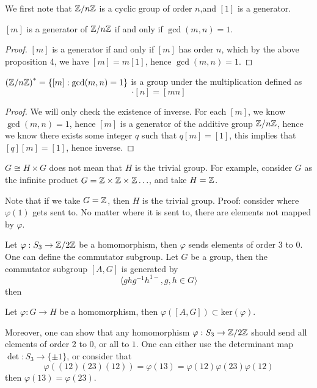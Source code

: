 We first note that $\mathbb{Z}/n\mathbb{Z}$ is a cyclic group of order $n$,and $[1]$ is a generator.
\begin{prop}
    $[m]$ is a generator of $\mathbb{Z}/n\mathbb{Z}$ if and only if $\gcd(m,n)=1$.
\end{prop}
\begin{proof}
    $[m]$ is a generator if and only if $[m]$ has order $n$, which by the above proposition 4, we have $[m]=m[1]$, hence $\gcd(m,n)=1$.
\end{proof}
\begin{prop}
    ${(\mathbb{Z}/n\mathbb{Z})}^*=\{[m]: \gcd(m,n)=1\}$ is a group under the multiplication defined as 
    \begin{equation*}
        [m]\cdot[n]=[mn]
    \end{equation*}
\end{prop}
\begin{proof}
    We will only check the existence of inverse. For each $[m]$, we know $\gcd(m,n)=1$, hence $[m]$ is a generator of the additive group $\mathbb{Z}/n\mathbb{Z}$, hence we know there exists some integer $q$ such that $q[m]=[1]$, this implies that $[q][m]=[1]$, hence inverse.
\end{proof}

\begin{example}
    $G\cong H\times G$ does not mean that $H$ is the trivial group. For example, consider $G$ as the infinite product $G=\mathbb{Z}\times\mathbb{Z}\times\mathbb{Z}\ldots$, and take $H=\mathbb{Z}$.

    Note that if we take $G=\mathbb{Z}$, then $H$ is the trivial group. Proof: consider where $\varphi(1)$ gets sent to. No matter where it is sent to, there are elements not mapped by $\varphi$.
\end{example}

\begin{example}
    Let $\varphi: S_3\to \mathbb{Z}/2\mathbb{Z}$ be a homomorphism, then $\varphi$ sends elements of order 3 to $0$. One can define the commutator subgroup. Let $G$ be a group, then the commutator subgroup $[A,G]$ is generated by
    \begin{equation*}
        \langle ghg^{-1}h^{1-}, g,h\in G\rangle
    \end{equation*}
    then 
    \begin{prop}
        Let $\varphi:G\to H$ be a homomorphism, then $\varphi([A,G])\subset \text{ker}(\varphi)$.
    \end{prop}
    Moreover, one can show that any homomorphism $\varphi: S_3\to\mathbb{Z}/2\mathbb{Z}$ should send all elements of order 2 to $0$, or all to $1$. One can either use the determinant map $\det: S_3\to\{\pm 1\}$, or consider that 
    \begin{equation*}
        \varphi((12)(23)(12))=\varphi(13)=\varphi(12)\varphi(23)\varphi(12)
    \end{equation*}
    then $\varphi(13)=\varphi(23)$. 
\end{example}

